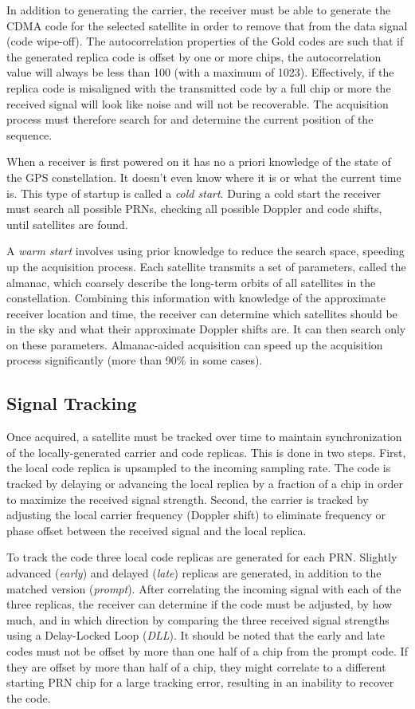 \documentclass[12pt]{article}
\begin{document}
In addition to generating the carrier, the receiver must be able to generate the CDMA code for the selected satellite in order to remove that from the data signal (code wipe-off). The autocorrelation properties of the Gold codes are such that if the generated replica code is offset by one or more chips, the autocorrelation value will always be less than 100 (with a maximum of 1023). Effectively, if the replica code is misaligned with the transmitted code by a full chip or more the received signal will look like noise and will not be recoverable. The acquisition process must therefore search for and determine the current position of the sequence.

When a receiver is first powered on it has no a priori knowledge of the state of the GPS constellation. It doesn't even know where it is or what the current time is. This type of startup is called a \emph{cold start}. During a cold start the receiver must search all possible PRNs, checking all possible Doppler and code shifts, until satellites are found.

A \emph{warm start} involves using prior knowledge to reduce the search space, speeding up the acquisition process. Each satellite transmits a set of parameters, called the almanac, which coarsely describe the long-term orbits of all satellites in the constellation. Combining this information with knowledge of the approximate receiver location and time, the receiver can determine which satellites should be in the sky and what their approximate Doppler shifts are. It can then search only on these parameters. Almanac-aided acquisition can speed up the acquisition process significantly (more than 90\% in some cases).

\subsection{Signal Tracking}
\label{sec:tracking}
Once acquired, a satellite must be tracked over time to maintain synchronization of the locally-generated carrier and code replicas. This is done in two steps. First, the local code replica is upsampled to the incoming sampling rate. The code is tracked by delaying or advancing the local replica by a fraction of a chip in order to maximize the received signal strength. Second, the carrier is tracked by adjusting the local carrier frequency (Doppler shift) to eliminate frequency or phase offset between the received signal and the local replica.

To track the code three local code replicas are generated for each PRN. Slightly advanced (\emph{early}) and delayed (\emph{late}) replicas are generated, in addition to the matched version (\emph{prompt}). After correlating the incoming signal with each of the three replicas, the receiver can determine if the code must be adjusted, by how much, and in which direction by comparing the three received signal strengths using a Delay-Locked Loop (\emph{DLL}). It should be noted that the early and late codes must not be offset by more than one half of a chip from the prompt code. If they are offset by more than half of a chip, they might correlate to a different starting PRN chip for a large tracking error, resulting in an inability to recover the code.
\end{document}
